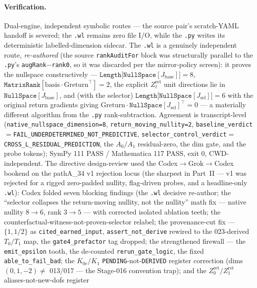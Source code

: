 \paragraph{Verification.}
Dual-engine, independent symbolic routes --- the source pair's scratch-YAML handoff is severed; the \texttt{.wl} remains zero
file I/O, while the \texttt{.py} writes its deterministic labelled-dimension sidecar. The \texttt{.wl} is
a genuinely independent route, \emph{re-authored} (the source \texttt{rankAuditFor} block was structurally parallel to the
\texttt{.py}'s \texttt{augRank}\(-\)\texttt{rank0}, so it was discarded per the mirror-policy screen): it proves the nullspace
constructively --- \(\texttt{Length[NullSpace}[J_{\mathrm{base}}]]=8\), \(\texttt{MatrixRank}[\mathrm{basis}\cdot\mathrm{Greturn}^{\!\top}]=2\),
the explicit \(Z_\ell^{\mathrm{ret}}\) unit directions lie in \(\texttt{NullSpace}[J_{\mathrm{base}}]\), and (with the selector)
\(\texttt{Length[NullSpace}[J_{\mathrm{sel}}]]=6\) with the original return gradients giving
\(\mathrm{Greturn}\cdot\texttt{NullSpace}[J_{\mathrm{sel}}]^{\!\top}=0\) --- a materially different algorithm from the \texttt{.py}
rank-subtraction. Agreement is transcript-level (\texttt{native\_nullspace\_dimension=8}, \texttt{return\_moving\_nullity=2},
\texttt{baseline\_verdict}\(=\)\texttt{FAIL\_UNDERDETERMINED\_NOT\_PREDICTIVE}, \texttt{selector\_control\_verdict}\(=\)\texttt{CROSS\_L\_RESIDUAL\_PREDICTION},
the \(A_0/A_1\) residual-zero, the dim gate, and the probe tokens); SymPy 111 PASS / Mathematica 117 PASS, exit 0, CWD-independent.
The directive design-review used the Codex\(\to\)Grok\(\to\)Codex bookend on the pathA\_34 v1 rejection locus (the sharpest in
Part~II --- v1 was rejected for a rigged zero-padded nullity, flag-driven probes, and a headline-only \texttt{.wl}): Codex folded
seven blocking findings (the \texttt{.wl} decisive re-author; the ``selector collapses the return-moving nullity, not the
nullity'' math fix --- native nullity \(8\to6\), rank \(3\to5\) --- with corrected isolated ablation teeth; the
counterfactual-witness-not-proven-selector relabel; the provenance-cut fix --- \(\{1,1/2\}\) as \texttt{cited\_earned\_input},
\texttt{assert\_not\_derive} rewired to the 023-derived \(T_0/T_1\) map, the \texttt{gate4\_prefactor} tag dropped; the
strengthened firewall --- the \texttt{emit\_epsilon} tooth, the de-counted \texttt{rerun\_gate\_logic}, the fixed
\texttt{able\_to\_fail\_bad}; the \(K_{0c}/K_1\) \texttt{PENDING}-not-\texttt{DERIVED} register correction (dims \((0,1,-2)\neq\)
013/017 --- the Stage-016 convention trap); and the \(Z_0^{\mathrm{ret}}/Z_1^{\mathrm{ret}}\) aliases-not-new-dofs register

